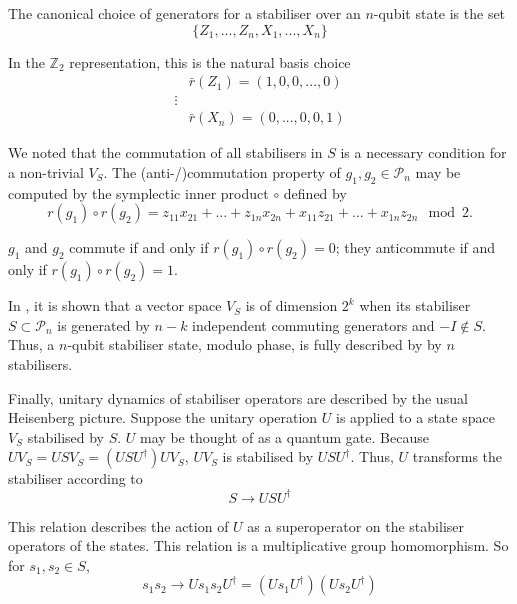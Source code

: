 \documentclass[10pt]{article}
\begin{document}
The canonical choice of generators for a stabiliser over an $n$-qubit state is the set
\begin{equation}
\{Z_1, ..., Z_n, X_1, ..., X_n\}
\end{equation}

In the $\mathbb{Z}_2$ representation, this is the natural basis choice
\begin{align}
&\bar{r}(Z_1) = (1, 0, 0, ..., 0) \nonumber \\
\vdots \nonumber \\
&\bar{r}(X_n) = (0, ..., 0, 0, 1)
\end{align}


We noted that the commutation of all stabilisers in $S$ is a necessary condition for a non-trivial $V_S$. The (anti-/)commutation property of $g_1, g_2 \in \mathcal{P}_n$ may be computed by the symplectic inner product $\circ$ defined by
\begin{equation}
r(g_1) \circ r(g_2) = z_{11} x_{21} + ... + z_{1n} x_{2n} + x_{11} z_{21} + ... + x_{1n} z_{2n} \mod 2.
\end{equation}

$g_1$ and $g_2$ commute if and only if $r(g_1) \circ r(g_2) = 0$; they anticommute if and only if $r(g_1) \circ r(g_2) = 1$.

In \cite{nielsen2002quantum}, it is shown that a vector space $V_S$ is of dimension $2^k$ when its stabiliser $S \subset \mathcal{P}_n$ is generated by $n-k$ independent commuting generators and $-I \notin S$. Thus, a $n$-qubit stabiliser state, modulo phase, is fully described by by $n$ stabilisers.

Finally, unitary dynamics of stabiliser operators are described by the usual Heisenberg picture. Suppose the unitary operation $U$ is applied to a state space $V_S$ stabilised by $S$. $U$ may be thought of as a quantum gate. Because $UV_S = USV_S = (USU^\dagger) U V_S$, $UV_S$ is stabilised by $USU^\dagger$. Thus, $U$ transforms the stabiliser according to
\begin{equation}
S \rightarrow U S U^\dagger
\label{eq_evol}
\end{equation}

This relation describes the action of $U$ as a superoperator on the stabiliser operators of the states. This relation is a multiplicative group homomorphism. So for $s_1,s_2 \in S$,
\begin{equation}
s_1 s_2 \rightarrow U s_1 s_2 U^\dagger = (U s_1 U^\dagger)(U s_2 U^\dagger)
\end{equation}
\end{document}
